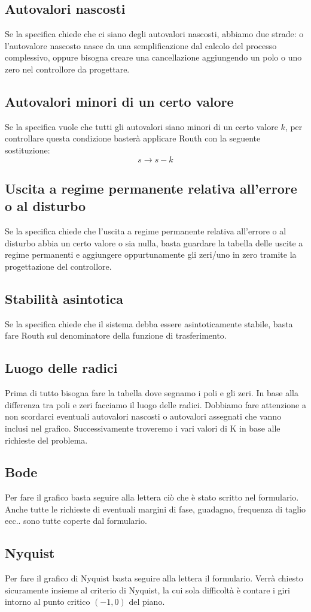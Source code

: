 \documentclass{report}
\theoremstyle{nostyle}
\begin{document}
\subsection{Autovalori nascosti}
Se la specifica chiede che ci siano degli autovalori nascosti, abbiamo due strade: o l'autovalore nascosto nasce da una semplificazione dal calcolo del processo complessivo, oppure 
bisogna creare una cancellazione aggiungendo un polo o uno zero nel controllore da progettare.

\subsection{Autovalori minori di un certo valore}
Se la specifica vuole che tutti gli autovalori siano minori di un certo valore $k$, per controllare questa condizione basterà applicare Routh con la seguente sostituzione:
\[   s\to s-k   \]

\subsection{Uscita a regime permanente relativa all'errore o al disturbo}
Se la specifica chiede che l'uscita a regime permanente relativa all'errore o al disturbo abbia un certo valore o sia nulla, basta guardare la tabella delle uscite a regime permanenti 
e aggiungere oppurtunamente gli zeri/uno in zero tramite la progettazione del controllore.

\subsection{Stabilità asintotica}
Se la specifica chiede che il sistema debba essere asintoticamente stabile, basta fare Routh sul denominatore della funzione di trasferimento.

\subsection{Luogo delle radici}
Prima di tutto bisogna fare la tabella dove segnamo i poli e gli zeri. In base alla differenza tra poli e zeri facciamo il luogo delle radici. Dobbiamo fare attenzione a non scordarci 
eventuali autovalori nascosti o autovalori assegnati che vanno inclusi nel grafico. Successivamente troveremo i vari valori di K in base alle richieste del problema.

\subsection{Bode}
Per fare il grafico basta seguire alla lettera ciò che è stato scritto nel formulario. Anche tutte le richieste di eventuali margini di fase, guadagno, frequenza di taglio ecc.. sono tutte 
coperte dal formulario.

\subsection{Nyquist}
Per fare il grafico di Nyquist basta seguire alla lettera il formulario. Verrà chiesto sicuramente insieme al criterio di Nyquist, la cui sola difficoltà è contare i giri intorno al punto 
critico $(-1,0)$ del piano.
\end{document}
